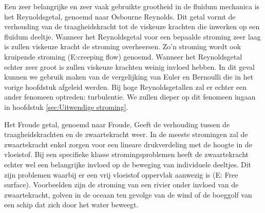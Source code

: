 Een zeer belangrijke en zeer vaak gebruikte grootheid in de flu\"idum mechanica is het Reynoldsgetal, genoemd naar Osbourne Reynolds. Dit getal vormt de verhouding van de traagheidskracht tot de viskeuze krachten die inwerken op een flu\"idum deeltje. Wanneer het Reynoldsgetal voor een bepaalde stroming zeer laag is zullen viskeuze kracht de stroming overheersen. Zo'n stroming wordt ook kruipende stroming (E:creeping flow) genoemd. Wanneer het Reynoldsgetal echter zeer groot is zullen viskeuze krachten weinig invloed hebben. In dit geval kunnen we gebruik maken van de vergelijking van Euler en Bernoulli die in het vorige hoofdstuk afgeleid werden. Bij hoge Reynoldsgetallen zal er echter een ander fenomeen optreden: turbulentie. We zullen dieper op dit fenomeen ingaan in hoofdstuk \ref{sec:Uitwendige stroming}.

Het Froude getal, genoemd naar Froude, Geeft de verhouding tussen de traagheidskrachten en de zwaartekracht weer. In de meeste stromingen zal de zwaartekracht enkel zorgen voor een lineare drukverdeling met de hoogte in de vloeistof. Bij een specifieke klasse stromingsproblemen heeft de zwaartekracht echter wel een belangrijke invloed op de beweging van individuele deeltjes. Dit zijn problemen waarbij er een vrij vloeistof oppervlak aanwezig is (E: Free surface). Voorbeelden zijn de stroming van een rivier onder invloed van de zwaartekracht, golven in de oceaan ten gevolge van de wind of de boeggolf van een schip dat zich door het water beweegt.

	\FloatBarrier

